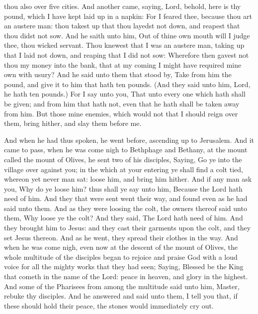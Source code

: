 thou also over five cities.  And another came, saying,
Lord, behold, here is thy pound, which I have kept laid up in a napkin:
 For I feared thee, because thou art an austere man: thou
takest up that thou layedst not down, and reapest that thou didst not
sow.  And he saith unto him, Out of thine own mouth will
I judge thee, thou wicked servant. Thou knewest that I was an austere
man, taking up that I laid not down, and reaping that I did not sow:
 Wherefore then gavest not thou my money into the bank,
that at my coming I might have required mine own with usury?
 And he said unto them that stood by, Take from him the
pound, and give it to him that hath ten pounds.  (And
they said unto him, Lord, he hath ten pounds.)  For I say
unto you, That unto every one which hath shall be given; and from him
that hath not, even that he hath shall be taken away from him.
 But those mine enemies, which would not that I should
reign over them, bring hither, and slay them before me.

 And when he had thus spoken, he went before, ascending
up to Jerusalem.  And it came to pass, when he was come
nigh to Bethphage and Bethany, at the mount called the mount of Olives,
he sent two of his disciples,  Saying, Go ye into the
village over against you; in the which at your entering ye shall find a
colt tied, whereon yet never man sat: loose him, and bring him hither.
 And if any man ask you, Why do ye loose him? thus shall
ye say unto him, Because the Lord hath need of him.  And
they that were sent went their way, and found even as he had said unto
them.  And as they were loosing the colt, the owners
thereof said unto them, Why loose ye the colt?  And they
said, The Lord hath need of him.  And they brought him to
Jesus: and they cast their garments upon the colt, and they set Jesus
thereon.  And as he went, they spread their clothes in
the way.  And when he was come nigh, even now at the
descent of the mount of Olives, the whole multitude of the disciples
began to rejoice and praise God with a loud voice for all the mighty
works that they had seen;  Saying, Blessed be the King
that cometh in the name of the Lord: peace in heaven, and glory in the
highest.  And some of the Pharisees from among the
multitude said unto him, Master, rebuke thy disciples. 
And he answered and said unto them, I tell you that, if these should
hold their peace, the stones would immediately cry out.

